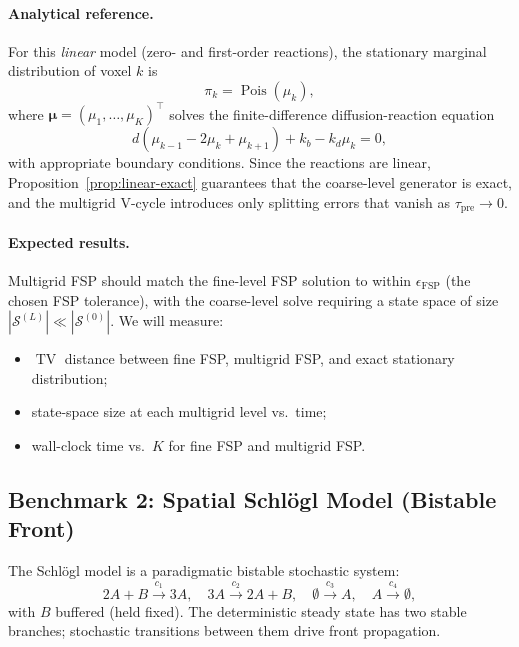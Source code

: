 \documentclass[review,onefignum,onetabnum]{siamart171218}
\newcommand{\calS}{\mathcal{S}}
\newcommand{\Pois}{\operatorname{Pois}}
\newcommand{\TV}{\operatorname{TV}}
\begin{document}
\paragraph{Analytical reference.}
For this \emph{linear} model (zero- and first-order reactions),
the stationary marginal distribution of voxel $k$ is
\begin{equation}
  \label{eq:pois-stat}
  \pi_k = \Pois(\mu_k),
\end{equation}
where $\boldsymbol{\mu} = (\mu_1,\ldots,\mu_K)^\top$ solves the
finite-difference diffusion-reaction equation
\begin{equation}
  d(\mu_{k-1} - 2\mu_k + \mu_{k+1}) + k_b - k_d \mu_k = 0,
\end{equation}
with appropriate boundary conditions.  Since the reactions are
linear, Proposition~\ref{prop:linear-exact} guarantees that the
coarse-level generator is exact, and the multigrid V-cycle
introduces only splitting errors that vanish as $\tau_{\mathrm{pre}} \to 0$.

\paragraph{Expected results.}
Multigrid FSP should match the fine-level FSP solution to within
$\epsilon_{\mathrm{FSP}}$ (the chosen FSP tolerance), with the
coarse-level solve requiring a state space of size
$|\calS^{(L)}| \ll |\calS^{(0)}|$.  We will measure:
\begin{itemize}
  \item $\TV$ distance between fine FSP, multigrid FSP, and exact
    stationary distribution;
  \item state-space size at each multigrid level vs.\ time;
  \item wall-clock time vs.\ $K$ for fine FSP and multigrid FSP.
\end{itemize}

\subsection{Benchmark 2: Spatial Schlögl Model (Bistable Front)}
\label{sec:schlogl}

The Schlögl model is a paradigmatic bistable stochastic system:
\begin{equation}
  \label{eq:schlogl}
  2A + B \xrightarrow{c_1} 3A, \quad
  3A \xrightarrow{c_2} 2A + B, \quad
  \emptyset \xrightarrow{c_3} A, \quad
  A \xrightarrow{c_4} \emptyset,
\end{equation}
with $B$ buffered (held fixed).  The deterministic steady state
has two stable branches; stochastic transitions between them
drive front propagation.
\end{document}
